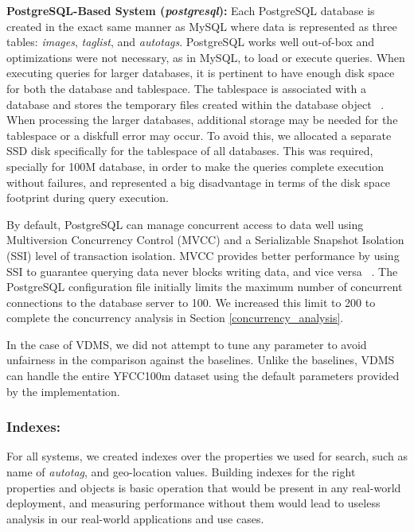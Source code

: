 \textbf{PostgreSQL-Based System (\textit{postgresql}):}
Each PostgreSQL database is created in the exact same manner as MySQL
where data is represented as three tables:
\textit{images}, \textit{taglist}, and \textit{autotags}.
PostgreSQL works well out-of-box and optimizations were not necessary,
as in MySQL, to load or execute queries.
When executing queries for larger databases,
it is pertinent to have enough disk space for both
the database and tablespace.
The tablespace is associated with a database and stores the temporary files
created within the database object ~\cite{postgresql}.
When processing the larger databases, additional
storage may be needed for the tablespace or a diskfull error may occur.
To avoid this, we allocated a separate SSD disk specifically
for the tablespace of all databases.
This was required, specially for 100M database, in order to make the queries
complete execution without failures, and represented a big disadvantage
in terms of the disk space footprint during query execution.

By default, PostgreSQL can manage concurrent access to data well using
Multiversion Concurrency Control (MVCC) and a Serializable Snapshot Isolation
(SSI) level of transaction isolation.
MVCC provides better performance by using SSI to guarantee querying data never
blocks writing data, and vice versa ~\cite{postgresql}.
The PostgreSQL configuration file initially limits the maximum
number of concurrent connections to the database server to 100.
We increased this limit to 200 to complete the concurrency analysis
in Section \ref{concurrency_analysis}.

In the case of VDMS, we did not attempt to tune any
parameter to avoid unfairness in the comparison against the baselines.
Unlike the baselines, VDMS can handle the entire YFCC100m dataset
using the default parameters provided by the implementation.

\subsubsection{Indexes:}
For all systems, we created indexes over the
properties we used for search, such as name of
\textit{autotag}, and geo-location values.
Building indexes for the right properties and objects
is basic operation that would be present in any real-world deployment,
and measuring performance without them would lead to useless analysis in our
real-world applications and use cases.

